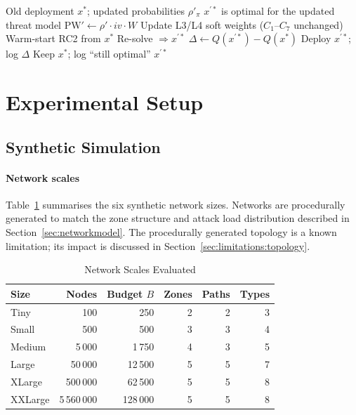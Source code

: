 \documentclass[journal]{IEEEtran}
\begin{document}
\begin{algorithm}
\caption{Adaptive Redeployment on Updated Threat Priors}
\label{alg:redeploy}
\begin{algorithmic}[1]
\REQUIRE Old deployment $x^*$; updated probabilities $\rho'_\pi$
\ENSURE $x^{\prime*}$ is optimal for the updated threat model
\STATE $\mathrm{PW}'\leftarrow\rho'\cdot iv\cdot W$
\STATE Update L3/L4 soft weights ($C_1$--$C_7$ unchanged)
\STATE Warm-start RC2 from $x^*$
\STATE Re-solve $\Rightarrow x^{\prime*}$
\STATE $\Delta\leftarrow Q(x^{\prime*})-Q(x^*)$
  \STATE Deploy $x^{\prime*}$; log $\Delta$
\ELSE
  \STATE Keep $x^*$; log ``still optimal''
\ENDIF
\RETURN $x^{\prime*}$
\end{algorithmic}
\end{algorithm}

\section{Experimental Setup}
\label{sec:eval}

\subsection{Synthetic Simulation}
\label{sec:eval:sim}

\paragraph{Network scales}
Table~\ref{tab:scales} summarises the six synthetic network sizes.
Networks are procedurally generated to match the zone structure and
attack load distribution described in Section~\ref{sec:networkmodel}.
The procedurally generated topology is a known limitation; its
impact is discussed in Section~\ref{sec:limitations:topology}.

\begin{table}[t]
\caption{Network Scales Evaluated}
\label{tab:scales}
\centering
\renewcommand{\arraystretch}{1.2}
\begin{tabular}{lrrrrr}
\toprule
Size & Nodes & Budget $B$ & Zones & Paths & Types \\
\midrule
Tiny    & 100            & 250      & 2 & 2 & 3 \\
Small   & 500            & 500      & 3 & 3 & 4 \\
Medium  & 5\,000         & 1\,750   & 4 & 3 & 5 \\
Large   & 50\,000        & 12\,500  & 5 & 5 & 7 \\
XLarge  & 500\,000       & 62\,500  & 5 & 5 & 8 \\
XXLarge & 5\,560\,000    & 128\,000 & 5 & 5 & 8 \\
\bottomrule
\end{tabular}
\end{table}
\end{document}
